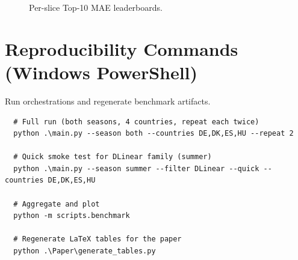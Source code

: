 \documentclass[10pt,conference]{IEEEtran}
\begin{document}
\begin{figure}[t]
  \hfill
  \caption{Per-slice Top-10 MAE leaderboards.}
  \label{fig:per_country_top10}
\end{figure}

  \appendices
  \section{Reproducibility Commands (Windows PowerShell)}
  Run orchestrations and regenerate benchmark artifacts.
  \begin{verbatim}
  # Full run (both seasons, 4 countries, repeat each twice)
  python .\main.py --season both --countries DE,DK,ES,HU --repeat 2

  # Quick smoke test for DLinear family (summer)
  python .\main.py --season summer --filter DLinear --quick --countries DE,DK,ES,HU

  # Aggregate and plot
  python -m scripts.benchmark

  # Regenerate LaTeX tables for the paper
  python .\Paper\generate_tables.py
  \end{verbatim}



\end{document}
